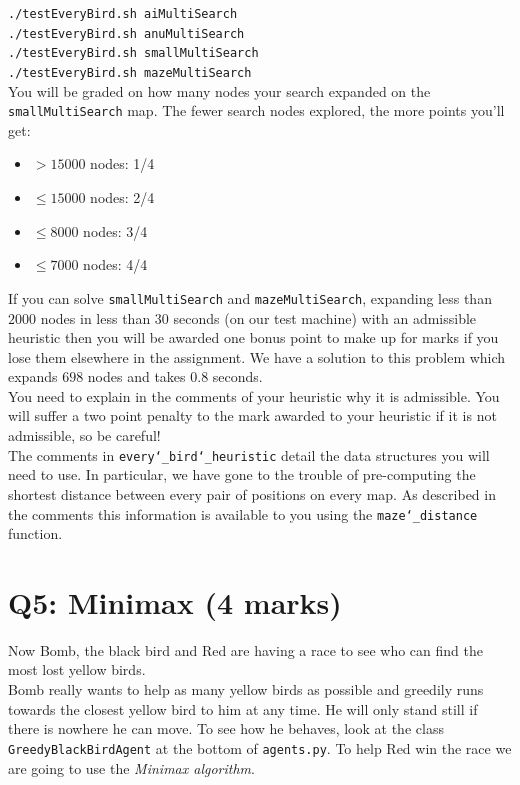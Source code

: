 \documentclass[12pt]{article}
\begin{document}
\texttt{./testEveryBird.sh aiMultiSearch}\\
\indent\texttt{./testEveryBird.sh anuMultiSearch}\\
\indent\texttt{./testEveryBird.sh smallMultiSearch}\\
\indent\texttt{./testEveryBird.sh mazeMultiSearch}\\

You will be graded on how many nodes your search expanded on the \texttt{smallMultiSearch} map.
The fewer search nodes explored, the more points you'll get:

\begin{itemize}
\item $> 15000$ nodes: 1/4
\item $\leq 15000$ nodes: 2/4
\item $\leq 8000$ nodes: 3/4
\item $\leq 7000$ nodes: 4/4
\end{itemize}

If you can solve \texttt{smallMultiSearch} and \texttt{mazeMultiSearch}, expanding less than $2000$ nodes
in less than $30$ seconds (on our test machine) with an admissible heuristic then you will be awarded
one bonus point to make up for marks if you lose them elsewhere in the assignment.
We have a solution to this problem which expands $698$ nodes and takes $0.8$ seconds.\\

You need to explain in the comments of your heuristic why it is admissible.
You will suffer a two point penalty to the mark awarded to your heuristic if it is not admissible, so
be careful!\\

The comments in \texttt{every\char`_bird\char`_heuristic} detail the data structures you
will need to use. In particular, we have gone to the trouble of pre-computing
the shortest distance between every pair of positions on every map.
As described in the comments this information is available to you using the
\texttt{maze\char`_distance} function.

\section{Q5: Minimax (4 marks)}

Now Bomb, the black bird and Red are having a race to see who can find the most lost yellow birds.\\

Bomb really wants to help as many yellow birds as possible and greedily runs towards the
closest yellow bird to him at any time. He will only stand still if there is nowhere he can move.
To see how he behaves, look at the class \texttt{GreedyBlackBirdAgent} at the
bottom of \texttt{agents.py}.
To help Red win the race we are going to use the {\em Minimax algorithm}.\\
\end{document}
